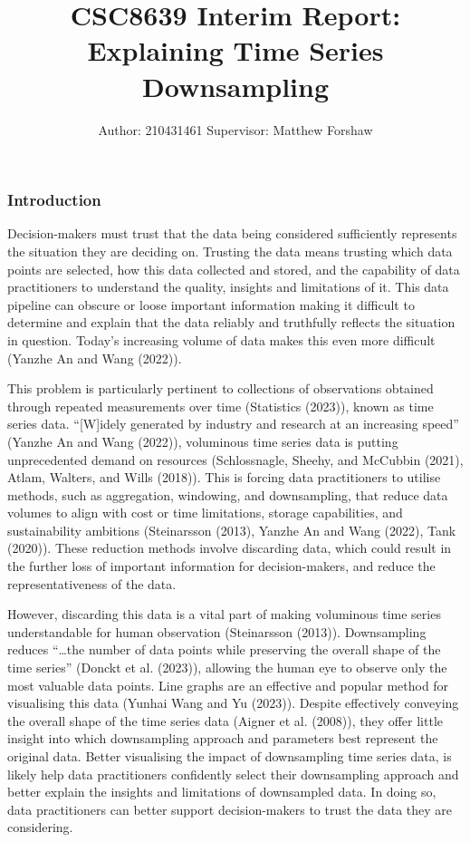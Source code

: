 \documentclass[
]{article}
\title{CSC8639 Interim Report: Explaining Time Series Downsampling}
\author{Author: 210431461 \textbar{} Supervisor: Matthew Forshaw}
\date{}
\begin{document}
\maketitle

\hypertarget{introduction}{%
\subsubsection{Introduction}\label{introduction}}

Decision-makers must trust that the data being considered sufficiently
represents the situation they are deciding on. Trusting the data means
trusting which data points are selected, how this data collected and
stored, and the capability of data practitioners to understand the
quality, insights and limitations of it. This data pipeline can obscure
or loose important information making it difficult to determine and
explain that the data reliably and truthfully reflects the situation in
question. Today's increasing volume of data makes this even more
difficult (Yanzhe An and Wang (2022)).

This problem is particularly pertinent to collections of observations
obtained through repeated measurements over time (Statistics (2023)),
known as time series data. ``{[}W{]}idely generated by industry and
research at an increasing speed'' (Yanzhe An and Wang (2022)),
voluminous time series data is putting unprecedented demand on resources
(Schlossnagle, Sheehy, and McCubbin (2021), Atlam, Walters, and Wills
(2018)). This is forcing data practitioners to utilise methods, such as
aggregation, windowing, and downsampling, that reduce data volumes to
align with cost or time limitations, storage capabilities, and
sustainability ambitions (Steinarsson (2013), Yanzhe An and Wang (2022),
Tank (2020)). These reduction methods involve discarding data, which
could result in the further loss of important information for
decision-makers, and reduce the representativeness of the data.

However, discarding this data is a vital part of making voluminous time
series understandable for human observation (Steinarsson (2013)).
Downsampling reduces ``\ldots the number of data points while preserving
the overall shape of the time series'' (Donckt et al. (2023)), allowing
the human eye to observe only the most valuable data points. Line graphs
are an effective and popular method for visualising this data (Yunhai
Wang and Yu (2023)). Despite effectively conveying the overall shape of
the time series data (Aigner et al. (2008)), they offer little insight
into which downsampling approach and parameters best represent the
original data. Better visualising the impact of downsampling time series
data, is likely help data practitioners confidently select their
downsampling approach and better explain the insights and limitations of
downsampled data. In doing so, data practitioners can better support
decision-makers to trust the data they are considering.
\end{document}
